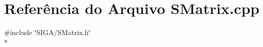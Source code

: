 \section{Referência do Arquivo S\+Matrix.\+cpp}
\label{_s_matrix_8cpp}
{\ttfamily \#include \char`\"{}S\+I\+G\+A/\+S\+Matrix.\+h\char`\"{}}\\*
